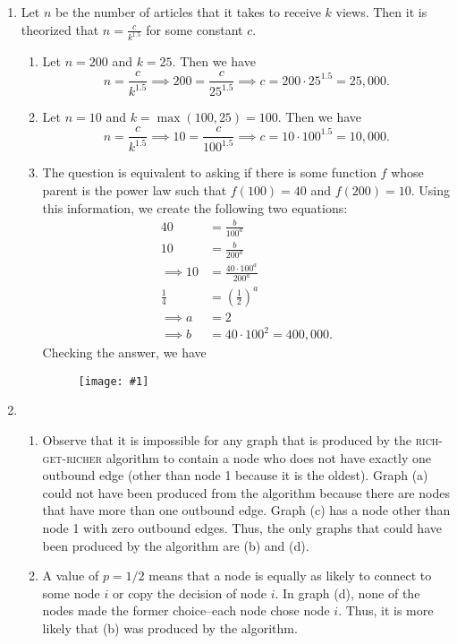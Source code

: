 \documentclass{article}
\newcommand{\image}[1]{\begin{figure}[H]
            \texttt{[image: \#1]}
            \centering
        \end{figure}}
\begin{document}
\begin{enumerate}
\begin{enumerate}
        \pagebreak
        \item We will observe that $z=1/4>1/8$ will grow to $z=9/16$ as shown in the following graph:
        
        \image{q2d.png}
    \end{enumerate}
    
    \item Let $n$ be the number of articles that it takes to receive $k$ views. Then it is theorized that $n=\frac{c}{k^{1.5}}$ for some constant $c$.
    \begin{enumerate}
        \item Let $n=200$ and $k=25$. Then we have
        $$n=\frac{c}{k^{1.5}} \implies 200=\frac{c}{25^{1.5}} \implies c=200\cdot25^{1.5}=25,000.$$
        \item Let $n=10$ and $k=\max(100,25)=100$. Then we have
        $$n=\frac{c}{k^{1.5}} \implies 10=\frac{c}{100^{1.5}} \implies c=10\cdot100^{1.5}=10,000.$$

        \pagebreak

        \item The question is equivalent to asking if there is some function $f$ whose parent is the power law such that $f(100)=40$ and $f(200)=10$. Using this information, we create the following two equations:
        \begin{align*}
            40 & =\frac{b}{100^a} \\
            10 & =\frac{b}{200^a} \\
            \implies 10 & =\frac{40\cdot100^a}{200^a} \\
            \frac{1}{4} & =\left(\frac{1}{2}\right)^a \\
            \implies a & =2 \\
            \implies b & =40\cdot100^2=400,000.
        \end{align*}
        Checking the answer, we have

        \image{q3c.png}
    \end{enumerate}

    \item
    \begin{enumerate}
        \item Observe that it is impossible for any graph that is produced by the \textsc{rich-get-richer} algorithm to contain a node who does not have exactly one outbound edge (other than node 1 because it is the oldest). Graph (a) could not have been produced from the algorithm because there are nodes that have more than one outbound edge. Graph (c) has a node other than node 1 with zero outbound edges. Thus, the only graphs that could have been produced by the algorithm are (b) and (d).
        
        \item A value of $p=1/2$ means that a node is equally as likely to connect to some node $i$ or copy the decision of node $i$. In graph (d), none of the nodes made the former choice--each node chose node $i$. Thus, it is more likely that (b) was produced by the algorithm.
    \end{enumerate}
\end{enumerate}
\end{document}
